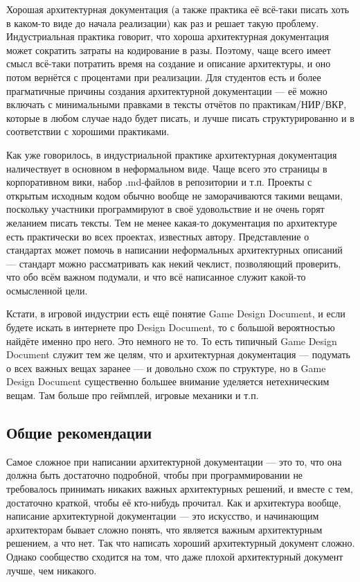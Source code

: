 \documentclass[a5paper]{article}
\begin{document}
Хорошая архитектурная документация (а также практика её всё-таки писать хоть в каком-то виде до начала реализации) как раз и решает такую проблему. Индустриальная практика говорит, что хороша архитектурная документация может сократить затраты на кодирование в разы. Поэтому, чаще всего имеет смысл всё-таки потратить время на создание и описание архитектуры, и оно потом вернётся с процентами при реализации. Для студентов есть и более прагматичные причины создания архитектурной документации --- её можно включать с минимальными правками в тексты отчётов по практикам/НИР/ВКР, которые в любом случае надо будет писать, и лучше писать структурированно и в соответствии с хорошими практиками.

Как уже говорилось, в индустриальной практике архитектурная документация наличествует в основном в неформальном виде. Чаще всего это страницы в корпоративном вики, набор .md-файлов в репозитории и т.п. Проекты с открытым исходным кодом обычно вообще не заморачиваются такими вещами, поскольку участники программируют в своё удовольствие и не очень горят желанием писать тексты. Тем не менее какая-то документация по архитектуре есть практически во всех проектах, известных автору. Представление о стандартах может помочь в написании неформальных архитектурных описаний --- стандарт можно рассматривать как некий чеклист, позволяющий проверить, что обо всём важном подумали, и что всё написанное служит какой-то осмысленной цели. 

Кстати, в игровой индустрии есть ещё понятие Game Design Document, и если будете искать в интернете про Design Document, то с большой вероятностью найдёте именно про него. Это немного не то. То есть типичный Game Design Document служит тем же целям, что и архитектурная документация --- подумать о всех важных вещах заранее --- и довольно схож по структуре, но в Game Design Document существенно большее внимание уделяется нетехническим вещам. Там больше про геймплей, игровые механики и т.п.

\subsection{Общие рекомендации}

Самое сложное при написании архитектурной документации --- это то, что она должна быть достаточно подробной, чтобы при программировании не требовалось принимать никаких важных архитектурных решений, и вместе с тем, достаточно краткой, чтобы её кто-нибудь прочитал. Как и архитектура вообще, написание архитектурной документации --- это искусство, и начинающим архитекторам бывает сложно понять, что является важным архитектурным решением, а что нет. Так что написать хороший архитектурный документ сложно. Однако сообщество сходится на том, что даже плохой архитектурный документ лучше, чем никакого.
\end{document}
